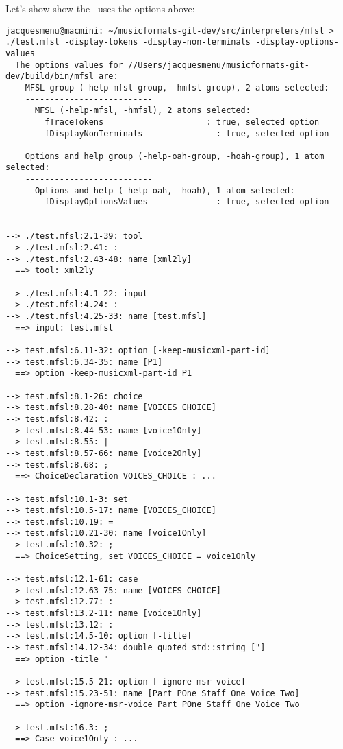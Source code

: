 Let's show show the \mfslInterp\ uses the options above:
\begin{lstlisting}[language=Terminal]
jacquesmenu@macmini: ~/musicformats-git-dev/src/interpreters/mfsl > ./test.mfsl -display-tokens -display-non-terminals -display-options-values
  The options values for //Users/jacquesmenu/musicformats-git-dev/build/bin/mfsl are:
    MFSL group (-help-mfsl-group, -hmfsl-group), 2 atoms selected:
    --------------------------
      MFSL (-help-mfsl, -hmfsl), 2 atoms selected:
        fTraceTokens                     : true, selected option
        fDisplayNonTerminals               : true, selected option

    Options and help group (-help-oah-group, -hoah-group), 1 atom selected:
    --------------------------
      Options and help (-help-oah, -hoah), 1 atom selected:
        fDisplayOptionsValues              : true, selected option


--> ./test.mfsl:2.1-39: tool
--> ./test.mfsl:2.41: :
--> ./test.mfsl:2.43-48: name [xml2ly]
  ==> tool: xml2ly

--> ./test.mfsl:4.1-22: input
--> ./test.mfsl:4.24: :
--> ./test.mfsl:4.25-33: name [test.mfsl]
  ==> input: test.mfsl

--> test.mfsl:6.11-32: option [-keep-musicxml-part-id]
--> test.mfsl:6.34-35: name [P1]
  ==> option -keep-musicxml-part-id P1

--> test.mfsl:8.1-26: choice
--> test.mfsl:8.28-40: name [VOICES_CHOICE]
--> test.mfsl:8.42: :
--> test.mfsl:8.44-53: name [voice1Only]
--> test.mfsl:8.55: |
--> test.mfsl:8.57-66: name [voice2Only]
--> test.mfsl:8.68: ;
  ==> ChoiceDeclaration VOICES_CHOICE : ...

--> test.mfsl:10.1-3: set
--> test.mfsl:10.5-17: name [VOICES_CHOICE]
--> test.mfsl:10.19: =
--> test.mfsl:10.21-30: name [voice1Only]
--> test.mfsl:10.32: ;
  ==> ChoiceSetting, set VOICES_CHOICE = voice1Only

--> test.mfsl:12.1-61: case
--> test.mfsl:12.63-75: name [VOICES_CHOICE]
--> test.mfsl:12.77: :
--> test.mfsl:13.2-11: name [voice1Only]
--> test.mfsl:13.12: :
--> test.mfsl:14.5-10: option [-title]
--> test.mfsl:14.12-34: double quoted std::string ["]
  ==> option -title "

--> test.mfsl:15.5-21: option [-ignore-msr-voice]
--> test.mfsl:15.23-51: name [Part_POne_Staff_One_Voice_Two]
  ==> option -ignore-msr-voice Part_POne_Staff_One_Voice_Two

--> test.mfsl:16.3: ;
  ==> Case voice1Only : ...


\end{lstlisting}
